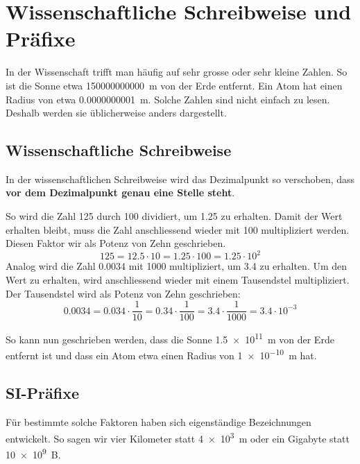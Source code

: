 \newpage
\section{Wissenschaftliche Schreibweise und Präfixe}

In der Wissenschaft trifft man häufig auf sehr grosse oder sehr kleine Zahlen. So ist die Sonne etwa \qty{150000000000}{m} von der Erde entfernt. Ein Atom hat einen Radius von etwa \qty{0.0000000001}{m}. Solche Zahlen sind nicht einfach zu lesen. Deshalb werden sie üblicherweise anders dargestellt.

\subsection{Wissenschaftliche Schreibweise}

In der wissenschaftlichen Schreibweise wird das Dezimalpunkt so verschoben, dass \textbf{vor dem Dezimalpunkt genau eine Stelle steht}.

So wird die Zahl 125 durch 100 dividiert, um 1.25 zu erhalten. Damit der Wert erhalten bleibt, muss die Zahl anschliessend wieder mit 100 multipliziert werden. Diesen Faktor wir als Potenz von Zehn geschrieben.
\[
  125 = 12.5\cdot 10 = 1.25 \cdot 100 = 1.25 \cdot 10^{2}
\]
Analog wird die Zahl 0.0034 mit 1000 multipliziert, um 3.4 zu erhalten. Um den Wert zu erhalten, wird anschliessend wieder mit einem Tausendstel multipliziert. Der Tausendstel wird als Potenz von Zehn geschrieben:
\[
  0.0034 = 0.034\cdot \frac{1}{10} = 0.34 \cdot\frac{1}{100} = 3.4\cdot\frac{1}{1000} = 3.4\cdot 10^{-3}
\]
\begin{example}
  So kann nun geschrieben werden, dass die Sonne \qty{1.5e11}{m} von der Erde entfernt ist und dass ein Atom etwa einen Radius von \qty{1e-10}{m} hat.
\end{example}

\newpage
\subsection{SI-Präfixe}

Für bestimmte solche Faktoren haben sich eigenständige Bezeichnungen entwickelt. So sagen wir vier Kilometer statt \qty{4e3}{m} oder ein Gigabyte statt \qty{10e9}{B}.

